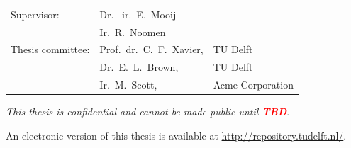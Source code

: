\begin{titlepage}
\begin{center}
\vfill

\begin{tabular}{lll}
    Supervisor: & Dr. \ ir.\ E.\ Mooij \\
    & Ir.\ R.\ Noomen \\
    Thesis committee:
        & Prof.\ dr.\ C.\ F.\ Xavier, & TU Delft \\
        & Dr.\ E.\ L.\ Brown, & TU Delft \\
        & Ir.\ M.\ Scott, & Acme Corporation
\end{tabular}

\bigskip
\bigskip
\emph{This thesis is confidential and cannot be made public until \textbf{\textcolor{red}{TBD}}}.

\bigskip
\bigskip
An electronic version of this thesis is available at \url{http://repository.tudelft.nl/}.

\end{center}

\end{titlepage}

